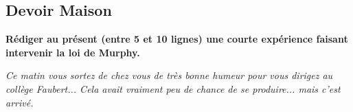 \subsection*{Devoir Maison}

\textbf{Rédiger au présent (entre 5 et 10 lignes) une courte expérience faisant intervenir la loi de Murphy.}

\textit{Ce matin vous sortez de chez vous de très bonne humeur pour vous dirigez au collège Faubert... Cela avait vraiment peu de chance de se produire... mais c'est arrivé.}\\

\Pointilles[18]



